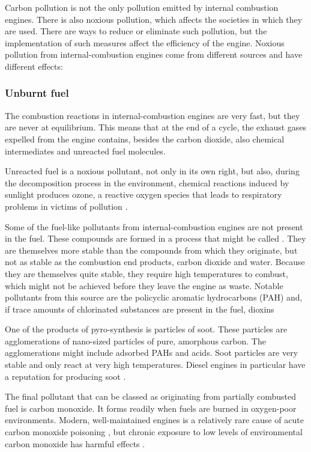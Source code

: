 Carbon pollution is not the only pollution emitted by internal combustion
engines. There is also noxious pollution, which affects the societies in which
they are used. There are ways to reduce or eliminate such pollution, but the
implementation of such measures affect the efficiency of the engine. Noxious
pollution from internal\hyp{}combustion engines come from different sourc\-es
and have different effects:

\subsubsection{Unburnt fuel}

The combustion reactions in internal\hyp{}combustion engines are very fast, but
they are never at equilibrium. This means that at the end of a cycle, the
exhaust gases expelled from the engine contains, besides the carbon dioxide,
also chemical intermediates and unreacted fuel molecules.

Unreacted fuel is a noxious pollutant, not only in its own right, but also,
during the decomposition process in the environment, chemical reactions induced
by sunlight produces ozone, a reactive oxygen species that leads to respiratory
problems in victims of pollution \autocite{Davidson1998}.

Some of the fuel-like pollutants from internal\hyp{}combustion engines are not
present in the fuel. These compounds are formed in a process that might be
called . They are themselves more stable than the
compounds from which they originate, but not as stable as the combustion end
products, carbon dioxide and water. Because they are themselves quite stable,
they require high temperatures to combust, which might not be achieved before
they leave the engine as waste. Notable pollutants from this source are the
policyclic aromatic hydrocarbons (PAH) and, if trace amounts of chlorinated
substances are present in the fuel, dioxins

One of the products of pyro-synthesis is particles of soot. These particles are
agglomerations of nano-sized particles of pure, amorphous carbon. The
agglomerations might include adsorbed PAHs and acids. Soot particles are very
stable and only react at very high temperatures. Diesel engines in particular
have a reputation for producing soot \autocite{Mohankumar2017}.

The final pollutant that can be classed as originating from partially combusted
fuel is carbon monoxide. It forms readily when fuels are burned in oxygen-poor
environments. Modern, well-maintained engines is a relatively rare cause of
acute carbon monoxide poisoning \autocite{Reumuth2018}, but chronic exposure to
low levels of environmental carbon monoxide has harmful effects
\autocite{Wright2002}.

